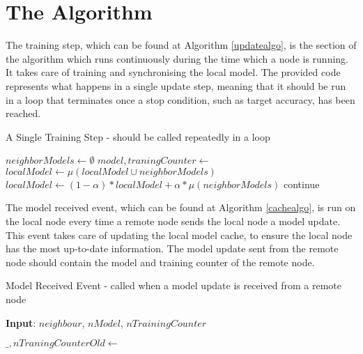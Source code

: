\section{The Algorithm}
The training step, which can be found at Algorithm \ref{updatealgo}, is the section of the algorithm which runs continuously during the time which a node is running. It takes care of training and synchronising the local model. The provided code represents what happens in a single update step, meaning that it should be run in a loop that terminates once a stop condition, such as target accuracy, has been reached.

\begin{algorithm}[H]
	\caption{A Single Training Step - should be called repeatedly in a loop} \label{updatealgo}
	\begin{algorithmic}[1]
		\State {}
		\State {}
		\EndFor
		
		\State $neighborModels \gets \emptyset$
		\State $model, traningCounter \gets$ 
		\State {}
		\EndIf
		\EndFor
		\State $localModel \gets \mu(localModel \cup neighborModels)$
		\State $localModel \gets (1 - \alpha) * localModel + \alpha * \mu(neighborModels)$
		\EndIf
		\Else
		\State continue
		\EndIf
		\State {}
		\EndFor
	\end{algorithmic}
\end{algorithm}

The model received event, which can be found at Algorithm \ref{cachealgo}, is run on the local node every time a remote node sends the local node a model update. This event takes care of updating the local model cache, to ensure the local node has the most up-to-date information. The model update sent from the remote node should contain the model and training counter of the remote node.

\begin{algorithm}[H]
	\caption{Model Received Event - called when a model update is received from a remote node} \label{cachealgo}
	\textbf{Input}: $neighbour$, $nModel$, $nTrainingCounter$
	\newline
	\begin{algorithmic}[1]
		\State $\_, nTraningCounterOld \gets$ 
		\State {}
		\EndIf
		\Else
		\State {}
		\EndIf
	\end{algorithmic}
\end{algorithm}

